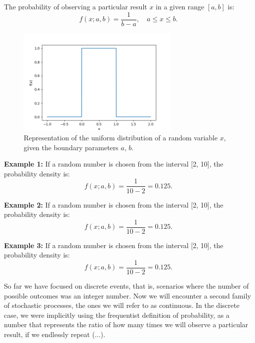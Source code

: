 \documentclass{book}
\begin{document}
The probability of observing a particular result $x$ in a given range $[a, b]$ is:
\begin{equation}
    f(x; a, b) = \frac{1}{b-a}, \quad a \leq x \leq b.
\end{equation}

\begin{figure}[ht]
    \centering
    \includegraphics[width=0.7\textwidth]{figures/chapter2/uniform.png}
    \caption{Representation of the uniform distribution of a random variable $x$, given the boundary parameters $a$, $b$.}
    \label{fig:random}
\end{figure}

\textbf{Example 1:} If a random number is chosen from the interval [2, 10], the probability density is:
\begin{equation}
    f(x; a, b) = \frac{1}{10-2} = 0.125.
\end{equation}

\textbf{Example 2:} If a random number is chosen from the interval [2, 10], the probability density is:
\begin{equation}
    f(x; a, b) = \frac{1}{10-2} = 0.125.
\end{equation}

\textbf{Example 3:} If a random number is chosen from the interval [2, 10], the probability density is:
\begin{equation}
    f(x; a, b) = \frac{1}{10-2} = 0.125.
\end{equation}

\newpage

So far we have focused on discrete events, that is, scenarios where the number of possible outcomes was an integer number. Now we will encounter a second family of stochastic processes, the ones we will refer to as continuous. In the discrete case, we were implicitly using the frequentist definition of probability, as a number that represents the ratio of how many times we will observe a particular result, if we endlessly repeat (...).\\
\end{document}
